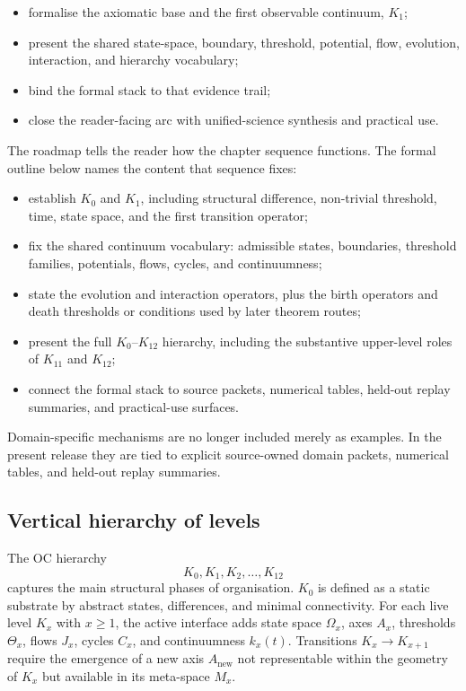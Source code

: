 \begin{itemize}
    \item formalise the axiomatic base and the first observable continuum,
          \(K_1\);
    \item present the shared state-space, boundary, threshold, potential, flow,
          evolution, interaction, and hierarchy vocabulary;
    \item bind the formal stack to that evidence trail;
    \item close the reader-facing arc with unified-science synthesis and
          practical use.
\end{itemize}

The roadmap tells the reader how the chapter sequence functions. The formal
outline below names the content that sequence fixes:

\begin{itemize}
    \item establish \(K_0\) and \(K_1\), including structural difference,
          non-trivial threshold, time, state space, and the first transition
          operator;
    \item fix the shared continuum vocabulary: admissible states, boundaries,
          threshold families, potentials, flows, cycles, and continuumness;
    \item state the evolution and interaction operators, plus the birth
          operators and death thresholds or conditions used by later theorem
          routes;
    \item present the full \(K_0\)–\(K_{12}\) hierarchy, including the
          substantive upper-level roles of \(K_{11}\) and \(K_{12}\);
    \item connect the formal stack to source packets, numerical tables,
          held-out replay summaries, and practical-use surfaces.
\end{itemize}

Domain-specific mechanisms are no longer included merely as examples. In the
present release they are tied to explicit source-owned domain packets,
numerical tables, and held-out replay summaries.

\subsection{Vertical hierarchy of levels}

The OC hierarchy
\[
K_0, K_1, K_2, \dots, K_{12}
\]
captures the main structural phases of organisation. \(K_0\) is defined as a
static substrate by abstract states, differences, and minimal connectivity. For
each live level \(K_x\) with \(x\ge 1\), the active interface adds state space
\(\Omega_x\), axes \(A_x\), thresholds \(\Theta_x\), flows \(J_x\), cycles
\(C_x\), and continuumness \(k_x(t)\). Transitions \(K_x \to K_{x+1}\) require
the emergence of a new axis \(A_{\mathrm{new}}\) not representable within the
geometry of \(K_x\) but available in its meta-space \(M_x\).

